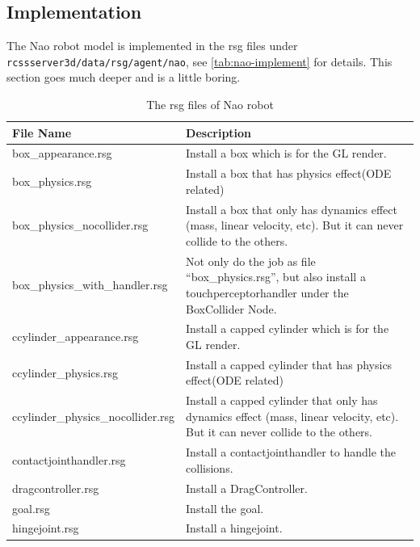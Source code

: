 \subsection{Implementation}
The Nao robot model is implemented in the rsg files under
\texttt{rcssserver3d/data/rsg/agent/nao}, see \autoref{tab:nao-implement}
for details. This section goes much deeper and is a little boring.
\begin{table}[htp]
  \centering
  \caption{The rsg files of Nao robot}
  \label{tab:nao-implement}
  \begin{tabular}{lp{}}
    \hline
    {\bf File Name}             & {\bf Description} \\
    \hline
    box\_appearance.rsg         & Install a box which is for the GL
    render. \\
    box\_physics.rsg            & Install a box that has physics
    effect(ODE related) \\
    box\_physics\_nocollider.rsg & Install a box that only has dynamics
    effect (mass, linear velocity, etc). But it can never collide to
    the others. \\
    box\_physics\_with\_handler.rsg & Not only do the job as file
    “box\_physics.rsg”, but also install a touchperceptorhandler under
    the BoxCollider Node. \\
    ccylinder\_appearance.rsg   & Install a capped cylinder which is
    for the GL render. \\
    ccylinder\_physics.rsg      & Install a capped cylinder that has
    physics effect(ODE related) \\
    ccylinder\_physics\_nocollider.rsg & Install a capped cylinder that
    only has dynamics effect (mass, linear velocity, etc). But it can
    never collide to the others. \\
    contactjointhandler.rsg    & Install a contactjointhandler to
    handle the collisions. \\
    dragcontroller.rsg         & Install a DragController. \\
    goal.rsg                   & Install the goal. \\
    hingejoint.rsg             & Install a hingejoint. \\
    \hline
  \end{tabular}
\end{table}

